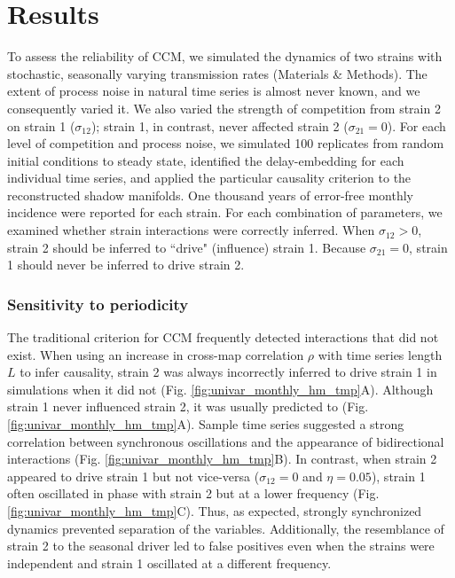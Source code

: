 \documentclass[10pt]{article}
\begin{document}
  
\section{Results}

To assess the reliability of CCM, we simulated the dynamics of two strains with stochastic, seasonally varying transmission rates (Materials \& Methods).
The extent of process noise in natural time series is almost never known, and we consequently varied it.
We also varied the strength of competition from strain 2 on strain 1 ($\sigma_{12}$); strain 1, in contrast, never affected strain 2 ($\sigma_{21}=0$).
For each level of competition and process noise, we simulated 100 replicates from random initial conditions to steady state, identified the delay-embedding for each individual time series, and applied the particular causality criterion to the reconstructed shadow manifolds.
One thousand years of error-free monthly incidence were reported for each strain.
For each combination of parameters, we examined whether strain interactions were correctly inferred.
When $\sigma_{12} >0$, strain 2 should be inferred to ``drive" (influence) strain 1. 
Because $\sigma_{21}=0$, strain 1 should never be inferred to drive strain 2.

\subsubsection{Sensitivity to periodicity}

The traditional criterion for CCM frequently detected interactions that did not exist.
When using an increase in cross-map correlation $\rho$ with time series length $L$ to infer causality, strain 2 was always incorrectly inferred to drive strain 1 in simulations when it did not (Fig. \ref{fig:univar_monthly_hm_tmp}A).
Although strain 1 never influenced strain 2, it was usually predicted to (Fig. \ref{fig:univar_monthly_hm_tmp}A). 
Sample time series suggested a strong correlation between synchronous oscillations and the appearance of bidirectional interactions (Fig. \ref{fig:univar_monthly_hm_tmp}B).
In contrast, when strain 2 appeared to drive strain 1 but not vice-versa ($\sigma_{12}=0$ and $\eta=0.05$), strain 1 often oscillated in phase with strain 2 but at a lower frequency (Fig. \ref{fig:univar_monthly_hm_tmp}C).
Thus, as expected, strongly synchronized dynamics prevented separation of the variables.
Additionally, the resemblance of strain 2 to the seasonal driver led to false positives even when the strains were independent and strain 1 oscillated at a different frequency.
\end{document}
